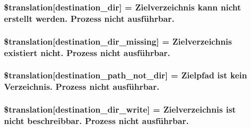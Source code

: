 \subsubsection[{\$translation}]{\setlength{\rightskip}{0pt plus 5cm}\$translation\mbox{[}\textquotesingle{}destination\+\_\+dir\textquotesingle{}\mbox{]} = \textquotesingle{}Zielverzeichnis kann nicht erstellt werden. Prozess nicht ausführbar.\textquotesingle{}}\label{class_8upload_8de___d_e_8php_aff2427c72a2598aefa6d58df1dd18b08}
\hypertarget{class_8upload_8de___d_e_8php_a9ef28d3cf09942c6c0a1e77fa09185e8}{}
\subsubsection[{\$translation}]{\setlength{\rightskip}{0pt plus 5cm}\$translation\mbox{[}\textquotesingle{}destination\+\_\+dir\+\_\+missing\textquotesingle{}\mbox{]} = \textquotesingle{}Zielverzeichnis existiert nicht. Prozess nicht ausführbar.\textquotesingle{}}\label{class_8upload_8de___d_e_8php_a9ef28d3cf09942c6c0a1e77fa09185e8}
\hypertarget{class_8upload_8de___d_e_8php_a5704a67137126e8c87b7a364175929d4}{}
\subsubsection[{\$translation}]{\setlength{\rightskip}{0pt plus 5cm}\$translation\mbox{[}\textquotesingle{}destination\+\_\+path\+\_\+not\+\_\+dir\textquotesingle{}\mbox{]} = \textquotesingle{}Zielpfad ist kein Verzeichnis. Prozess nicht ausführbar.\textquotesingle{}}\label{class_8upload_8de___d_e_8php_a5704a67137126e8c87b7a364175929d4}
\hypertarget{class_8upload_8de___d_e_8php_a97608ea194a616db49141a0e6dee900c}{}
\subsubsection[{\$translation}]{\setlength{\rightskip}{0pt plus 5cm}\$translation\mbox{[}\textquotesingle{}destination\+\_\+dir\+\_\+write\textquotesingle{}\mbox{]} = \textquotesingle{}Zielverzeichnis ist nicht beschreibbar. Prozess nicht ausführbar.\textquotesingle{}}\label{class_8upload_8de___d_e_8php_a97608ea194a616db49141a0e6dee900c}
\hypertarget{class_8upload_8de___d_e_8php_a40e4e1962226b89fd76da5819a9602b0}{}
